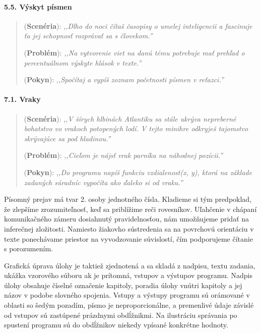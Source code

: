 \paragraph{5.5. Výskyt písmen}
\begin{quote}
(\textbf{Scenéria}): \textit{\small ,,Dlho do noci čítaš časopisy o umelej inteligencii a fascinuje ťa jej schopnosť rozprávať sa s človekom.''}

(\textbf{Problém}): \textit{\small ,,Na vytvorenie viet na danú tému potrebuje mať prehľad o percentuálnom výskyte hlások v texte.''}

(\textbf{Pokyn}): \textit{\small ,,Spočítaj a vypíš zoznam početnosti písmen v reťazci.''}
\end{quote}

\paragraph{7.1. Vraky}
\begin{quote}
(\textbf{Scenéria}): \textit{\small ,,V šírych hlbinách Atlantiku sa stále ukrýva nepreberné bohatstvo vo vrakoch potopených lodí. V tejto minihre odkryješ tajomstvo skrývajúce sa pod hladinou.''}

(\textbf{Problém}): \textit{\small ,,Cieľom je nájsť vrak parníka na náhodnej pozícii.''}

(\textbf{Pokyn}): \textit{\small ,,Do programu napíš funkciu vzdialenost(x, y), ktorá na základe zadaných súradníc vypočíta ako ďaleko si od vraku.''}
\end{quote}

Písomný prejav má tvar 2. osoby jednotného čísla. Kladieme si tým predpoklad, že zlepšíme zrozumiteľnosť, keď sa priblížime reči rovesníkov. Uľahčenie v chápaní komunikačného zámeru dosiahnutý pravidelnosťou, nám umožňujeme pridať na inferečnej zložitosti. Namiesto žiakovho sústredenia sa na povrchovú orientáciu v texte ponechávame priestor na vyvodzovanie súvislostí, čím podporujeme čítanie s porozumením.

Grafická úprava úlohy je taktiež zjednotená a sa skladá z nadpisu, textu zadania, ukážka vzorového súboru ak je prítomná, vstupov a výstupov programu. Nadpis úlohy obsahuje číselné označenie kapitoly, poradia úlohy vnútri kapitoly a jej názov v podobe slovného spojenia.
Vstupy a výstupy programu sú orámované v oblasti so šedým pozadím, písmo je neproporcionálne, a premenlivé údaje závislé od vstupov sú zastúpené prázdnymi obdĺžnikmi. Na ilustráciu správania po spustení programu sú do obdĺžnikov niekedy vpísané konkrétne hodnoty.

